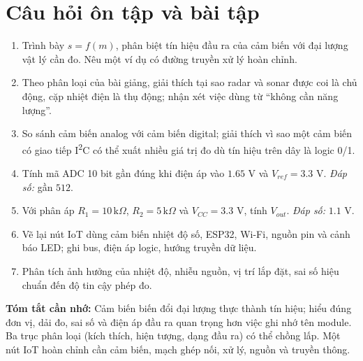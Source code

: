 \section{Câu hỏi ôn tập và bài tập}
\begin{enumerate}
\item Trình bày $s=f(m)$, phân biệt tín hiệu đầu ra của cảm biến với đại lượng vật lý cần đo. Nêu một ví dụ có đường truyền xử lý hoàn chỉnh.
\item Theo phân loại của bài giảng, giải thích tại sao radar và sonar được coi là chủ động, cặp nhiệt điện là thụ động; nhận xét việc dùng từ ``không cần năng lượng''.
\item So sánh cảm biến analog với cảm biến digital; giải thích vì sao một cảm biến có giao tiếp I\textsuperscript{2}C có thể xuất nhiều giá trị đo dù tín hiệu trên dây là logic 0/1.
\item Tính mã ADC 10 bit gần đúng khi điện áp vào $1.65$ V và $V_{ref}=3.3$ V. \emph{Đáp số:} gần $512$.
\item Với phân áp $R_1=10\,\mathrm{k}\Omega$, $R_2=5\,\mathrm{k}\Omega$ và $V_{CC}=3.3$ V, tính $V_{out}$. \emph{Đáp số:} $1.1$ V.
\item Vẽ lại nút IoT dùng cảm biến nhiệt độ số, ESP32, Wi-Fi, nguồn pin và cảnh báo LED; ghi bus, điện áp logic, hướng truyền dữ liệu.
\item Phân tích ảnh hưởng của nhiệt độ, nhiễu nguồn, vị trí lắp đặt, sai số hiệu chuẩn đến độ tin cậy phép đo.
\end{enumerate}

\begin{notebox}\textbf{Tóm tắt cần nhớ:} Cảm biến biến đổi đại lượng thực thành tín hiệu; hiểu đúng đơn vị, dải đo, sai số và điện áp đầu ra quan trọng hơn việc ghi nhớ tên module. Ba trục phân loại (kích thích, hiện tượng, dạng đầu ra) có thể chồng lấp. Một nút IoT hoàn chỉnh cần cảm biến, mạch ghép nối, xử lý, nguồn và truyền thông.\end{notebox}
